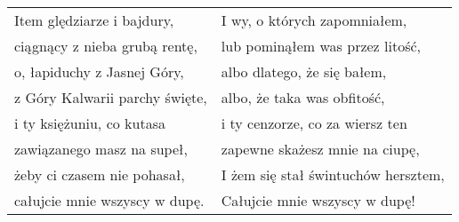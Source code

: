 \documentclass[a5paper]{article}
\begin{document}
\noindent
\begin{tabular}{@{}p{5cm}|p{5.5cm}@{}}
	Item ględziarze i bajdury, & I wy, o których zapomniałem,\\
	ciągnący z nieba grubą rentę, & lub pominąłem was przez litość,\\
	o, łapiduchy z Jasnej Góry, & albo dlatego, że się bałem,\\
	z Góry Kalwarii parchy święte, & albo, że taka was obfitość,\\
	i ty księżuniu, co kutasa & i ty cenzorze, co za wiersz ten\\
	zawiązanego masz na supeł, & zapewne skażesz mnie na ciupę,\\
	żeby ci czasem nie pohasał, & I żem się stał świntuchów hersztem,\\
	całujcie mnie wszyscy w dupę. & Całujcie mnie wszyscy w dupę!
\end{tabular}
\end{document}
